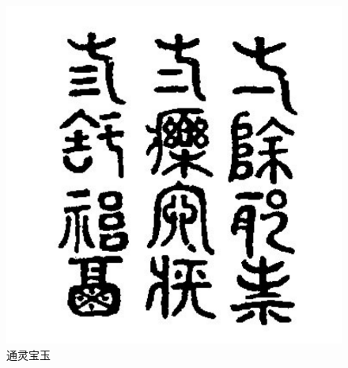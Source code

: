 \begin{figure}[htbp]
{\begin{minipage}{5cm}
			\includegraphics[scale=0.2]{../images/00019} %
		\end{minipage}
	}
	\caption{通灵宝玉} %
	\label{fig:1} %
\end{figure}
%
%
%
%
%
%
%
%
%

